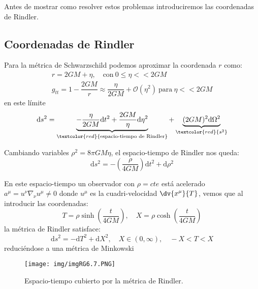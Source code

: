 \documentclass[../main]{subfiles}
\begin{document}
Antes de mostrar como resolver estos problemas introduciremos las coordenadas de Rindler.

\subsection{Coordenadas de Rindler}

Para la métrica de Schwarzschild podemos aproximar la coordenada $r$ como:
\begin{equation}
    \begin{split}
        r=2GM+\eta,\quad \text{con} \ 0\leq \eta << 2GM\\
        g_{tt}=1-\dfrac{2GM}{r}\approx \dfrac{\eta}{2GM}+\mathcal{O}(\eta^2) \ \text{para} \ \eta << 2GM
    \end{split}
\end{equation}
en este límite 
\begin{equation}
    \mathrm{d}s^2=\underbrace{-\dfrac{\eta}{2GM}\mathrm{d}t^2+\dfrac{2GM}{\eta}\mathrm{d}\eta^2}_{\textcolor{red}{\text{espacio-tiempo de Rindler}}}+\underbrace{(2GM)^2\mathrm{d}\Omega^2}_{\textcolor{red}{s^2}}
\end{equation}

Cambiando variables $\rho^2=8\pi GM \eta$, el espacio-tiempo de Rindler nos queda:
\begin{equation}
    \mathrm{d}s^2=-\left(\dfrac{\rho}{4GM}\right)\mathrm{d}t^2+\mathrm{d}\rho^2
\end{equation}

En este espacio-tiempo un observador con $\rho=cte$ está acelerado $a^{\mu}=u^{\nu}\nabla_{\nu}u^{\mu}\neq 0$ donde $u^{\mu}$ es la cuadri-velocidad $\displaystyle\dv{x^{\mu}}{T}$, vemos que al introducir las coordenadas:
\begin{equation}
    T=\rho \sinh\left(\dfrac{t}{4GM}\right),\quad X=\rho \cosh\left(\dfrac{t}{4GM}\right)
\end{equation}
la métrica de Rindler satisface:
\begin{equation}
    \mathrm{d}s^2=-\mathrm{d}T^2+\mathrm{d}X^2,\quad X\in (0, \infty), \quad -X< T < X
\end{equation}
reduciéndose a una métrica de Minkowski
\begin{figure}[h]
    \begin{center}
        \texttt{[image: img/imgRG6.7.PNG]}
        \caption{Espacio-tiempo cubierto por la métrica de Rindler.}
    \end{center}
\end{figure}
\end{document}
